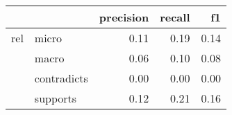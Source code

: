 \begin{tabular}{llrrr}
\toprule
    &          &  precision &  recall &   f1 \\
\midrule
rel & micro &       0.11 &    0.19 & 0.14 \\
    & macro &       0.06 &    0.10 & 0.08 \\
    & contradicts &       0.00 &    0.00 & 0.00 \\
    & supports &       0.12 &    0.21 & 0.16 \\
\bottomrule
\end{tabular}
